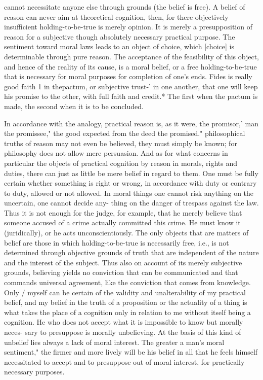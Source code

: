 cannot necessitate anyone else through grounds (the belief is free).
A belief of reason can never aim at theoretical cognition, then, for there objectively
insufficient holding-to-be-true is merely opinion. It is merely a presupposition of reason for
a subjective though absolutely necessary practical purpose. The sentiment toward moral
laws leads to an object of choice, which [choice] is determinable through pure reason. The
acceptance of the feasibility of this object, and hence of the reality of its cause, is a moral
belief, or a free holding-to-be-true that is necessary for moral purposes for completion of
one's ends.
Fides is really good faith 1 in thepactum, or subjective trust-' in one another, that one will keep
his promise to the other, with full faith and credit.* The first when the pactum is made, the
second when it is to be concluded.

In accordance with the analogy, practical reason is, as it were, the promisor,' man the
promissee," the good expected from the deed the promised."
philosophical truths of reason may not even be believed, they must simply
be known; for philosophy does not allow mere persuasion. And as for
what concerns in particular the objects of practical cognition by reason in
morals, rights and duties, there can just as little be mere belief in regard to
them. One must be fully certain whether something is right or wrong, in
accordance with duty or contrary to duty, allowed or not allowed. In moral
things one cannot risk anything on the uncertain, one cannot decide any-
thing on the danger of trespass against the law. Thus it is not enough for the
judge, for example, that he merely believe that someone accused of a crime
actually committed this crime. He must know it (juridically), or he acts
unconscientiously.
 The only objects that are matters of belief are those in which
holding-to-be-true is necessarily free, i.e., is not determined through
objective grounds of truth that are independent of the nature and the
interest of the subject.
Thus also on account of its merely subjective grounds, believing yields
no conviction that can be communicated and that commands universal
agreement, like the conviction that comes from knowledge. Only / myself
can be certain of the validity and unalterability of my practical belief, and
my belief in the truth of a proposition or the actuality of a thing is what
takes the place of a cognition only in relation to me without itself being a
cognition.
He who does not accept what it is impossible to know but morally neces-
sary to presuppose is morally unbelieving. At the basis of this kind of
unbelief lies always a lack of moral interest. The greater a man's moral
sentiment," the firmer and more lively will be his belief in all that he feels
himself necessitated to accept and to presuppose out of moral interest, for
practically necessary purposes.

